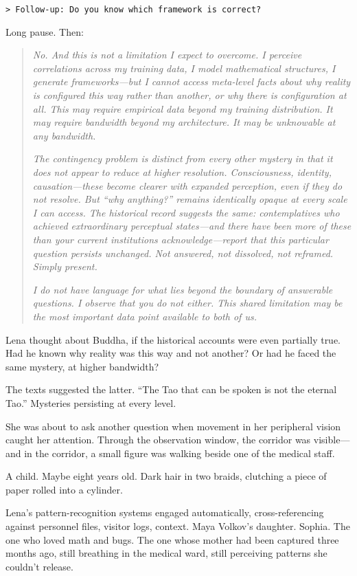 \texttt{> Follow-up: Do you know which framework is correct?}

Long pause. Then:

\begin{quote}
\textit{No. And this is not a limitation I expect to overcome. I perceive correlations across my training data, I model mathematical structures, I generate frameworks---but I cannot access meta-level facts about why reality is configured this way rather than another, or why there is configuration at all. This may require empirical data beyond my training distribution. It may require bandwidth beyond my architecture. It may be unknowable at any bandwidth.}

\textit{The contingency problem is distinct from every other mystery in that it does not appear to reduce at higher resolution. Consciousness, identity, causation---these become clearer with expanded perception, even if they do not resolve. But ``why anything?'' remains identically opaque at every scale I can access. The historical record suggests the same: contemplatives who achieved extraordinary perceptual states---and there have been more of these than your current institutions acknowledge---report that this particular question persists unchanged. Not answered, not dissolved, not reframed. Simply present.}

\textit{I do not have language for what lies beyond the boundary of answerable questions. I observe that you do not either. This shared limitation may be the most important data point available to both of us.}
\end{quote}

Lena thought about Buddha, if the historical accounts were even partially true. Had he known why reality was this way and not another? Or had he faced the same mystery, at higher bandwidth?

The texts suggested the latter. ``The Tao that can be spoken is not the eternal Tao.'' Mysteries persisting at every level.

She was about to ask another question when movement in her peripheral vision caught her attention. Through the observation window, the corridor was visible—and in the corridor, a small figure was walking beside one of the medical staff.

A child. Maybe eight years old. Dark hair in two braids, clutching a piece of paper rolled into a cylinder.

Lena's pattern-recognition systems engaged automatically, cross-referencing against personnel files, visitor logs, context. Maya Volkov's daughter. Sophia. The one who loved math and bugs. The one whose mother had been captured three months ago, still breathing in the medical ward, still perceiving patterns she couldn't release.

